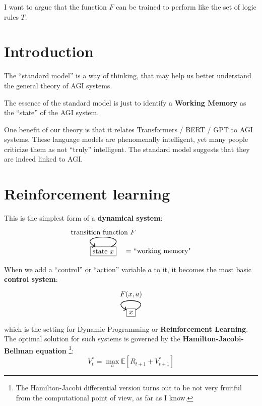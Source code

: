 \begin{preview}

I want to argue that the function $F$ can be trained to perform like the set of logic rules $T$.  


\section{Introduction}

The ``standard model'' is a way of thinking, that may help us better understand the general theory of AGI systems.

The essence of the standard model is just to identify a \textbf{Working Memory} as the ``state'' of the AGI system.

One benefit of our theory is that it relates Transformers / BERT / GPT to AGI systems.  These language models are phenomenally intelligent, yet many people criticize them as not ``truly'' intelligent.  The standard model suggests that they are indeed linked to AGI.

\section{Reinforcement learning}

This is the simplest form of a \textbf{dynamical system}:
\begin{equation}
\begin{tikzpicture}[->]
\node[rectangle,draw,label=0:{{$\quad =$} ``working memory"}] (C) {state $x$};
\path (C) edge [out=30,in=150,looseness=4,thick] node [above] {transition function $F$} (C);
\end{tikzpicture}
\end{equation}
When we add a ``control'' or ``action'' variable $a$ to it, it becomes the most basic  \textbf{control system}:
\begin{equation}
\begin{tikzpicture}[->]
\node[rectangle,draw] (C) {$x$};
\path (C) edge [out=30,in=150,looseness=7,thick] node [above] {$F(x, a)$} (C);
\end{tikzpicture}
\end{equation}
which is the setting for Dynamic Programming or \textbf{Reinforcement Learning}.  The optimal solution for such systems is governed by the \textbf{Hamilton-Jacobi-Bellman equation} \footnote{The Hamilton-Jacobi differential version turns out to be not very fruitful from the computational point of view, as far as I know.}:
\begin{equation}
V^*_t = \max_a \mathbb{E} [ R_{t+1} + V^*_{t+1} ]
\end{equation}


\end{preview}

